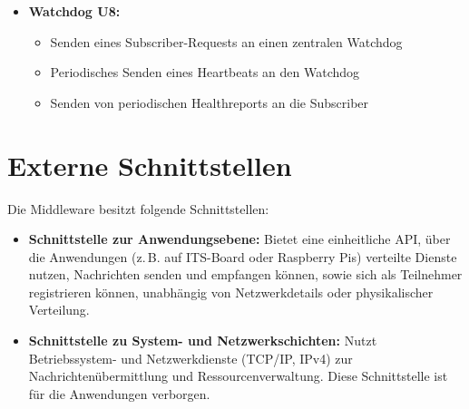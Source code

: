 \begin{itemize}
	\item \textbf{Watchdog U8:}\\
	\begin{itemize}
		\item Senden eines Subscriber-Requests an einen zentralen Watchdog
		\item Periodisches Senden eines Heartbeats an den Watchdog
		\item Senden von periodischen Healthreports an die Subscriber		
	\end{itemize}
\end{itemize}
	
\section{Externe Schnittstellen}

Die Middleware besitzt folgende Schnittstellen:

\begin{itemize}
	\item \textbf{Schnittstelle zur Anwendungsebene:}  
	Bietet eine einheitliche API, über die Anwendungen (z.\,B. auf ITS-Board oder Raspberry Pis) verteilte Dienste nutzen, Nachrichten senden und empfangen können, sowie sich als Teilnehmer registrieren können, unabhängig von Netzwerkdetails oder physikalischer Verteilung.
	
	\item \textbf{Schnittstelle zu System- und Netzwerkschichten:}  
	Nutzt Betriebssystem- und Netzwerkdienste (TCP/IP, IPv4) zur Nachrichtenübermittlung und Ressourcenverwaltung. Diese Schnittstelle ist für die Anwendungen verborgen.
\end{itemize}